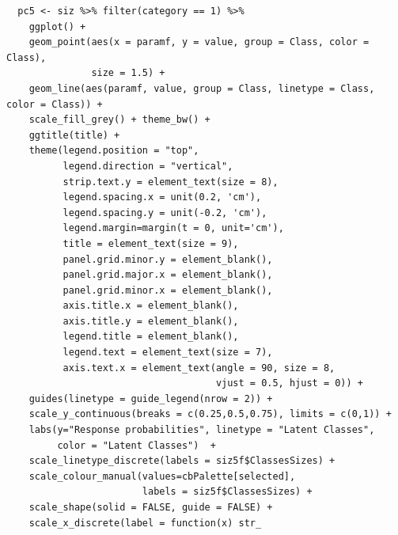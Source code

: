 \documentclass[12pt,a4paper,oneside]{reedthesis}
\begin{document}
\begin{verbatim}
  pc5 <- siz %>% filter(category == 1) %>% 
    ggplot() +
    geom_point(aes(x = paramf, y = value, group = Class, color = Class), 
               size = 1.5) +
    geom_line(aes(paramf, value, group = Class, linetype = Class, color = Class)) +
    scale_fill_grey() + theme_bw() +
    ggtitle(title) +
    theme(legend.position = "top", 
          legend.direction = "vertical",
          strip.text.y = element_text(size = 8),
          legend.spacing.x = unit(0.2, 'cm'),
          legend.spacing.y = unit(-0.2, 'cm'),
          legend.margin=margin(t = 0, unit='cm'),
          title = element_text(size = 9), 
          panel.grid.minor.y = element_blank(),
          panel.grid.major.x = element_blank(),
          panel.grid.minor.x = element_blank(),
          axis.title.x = element_blank(),
          axis.title.y = element_blank(), 
          legend.title = element_blank(),
          legend.text = element_text(size = 7),
          axis.text.x = element_text(angle = 90, size = 8, 
                                     vjust = 0.5, hjust = 0)) +
    guides(linetype = guide_legend(nrow = 2)) +
    scale_y_continuous(breaks = c(0.25,0.5,0.75), limits = c(0,1)) +
    labs(y="Response probabilities", linetype = "Latent Classes", 
         color = "Latent Classes")  +
    scale_linetype_discrete(labels = siz5f$ClassesSizes) +
    scale_colour_manual(values=cbPalette[selected], 
                        labels = siz5f$ClassesSizes) +
    scale_shape(solid = FALSE, guide = FALSE) +
    scale_x_discrete(label = function(x) str_ 
\end{verbatim}
\end{document}
